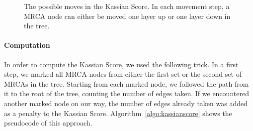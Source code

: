 \documentclass{llncs}
\begin{document}
\begin{figure}[H!]
\centering
{} 

   
\caption{The possible moves in the Kassian Score. In each movement step, a MRCA node can either be moved one layer up or one layer down in the tree.}
\label{fig:movements}
\end{figure}

\paragraph{Computation}
In order to compute the Kassian Score, we used the following trick. In a first step, we marked all MRCA nodes from either the first set or the second set of MRCAs in the tree. Starting from each marked node, we followed the path from it to the root of the tree, counting the number of edges taken. If we encountered another marked node on our way, the number of edges already taken was added as a penalty to the Kassian Score. Algorithm~\ref{algo:kassianscore} shows the pseudocode of this approach.
\end{document}

